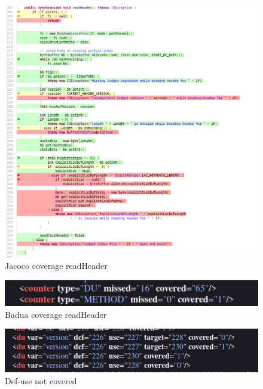 \documentclass[12pt, a4paper]{article}
\begin{document}
  \begin{figure}
    \includegraphics[width=\linewidth]{./images/file_info/JacocoCoveragereadHeader2.png}
    \caption{Jacoco coverage readHeader}
    \label{fig:JacocoCoveragereadHeader2}
  \end{figure}

  \begin{figure}
    \includegraphics[width=\linewidth]{./images/file_info/BaduaCoverageReadHeader1.png}
    \caption{Badua coverage readHeader}
    \label{fig:BaduaCoverageReadHeader1}
  \end{figure}

  \begin{figure}
    \includegraphics[width=\linewidth]{./images/file_info/BaduaCoverageReadHeader2.png}
    \caption{Def-use not covered}
    \label{fig:BaduaCoverageReadHeader2}
  \end{figure}
\end{document}
